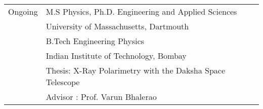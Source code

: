 {\centering
\begin{tabular}{>{\raggedleft\arraybackslash}p{} p{}}
    
    Ongoing             & M.S Physics, Ph.D. Engineering and Applied Sciences \\
                        & University of Massachusetts, Dartmouth \\
    2022                & B.Tech Engineering Physics \\
                        & Indian Institute of Technology, Bombay \\
                        & Thesis: X-Ray Polarimetry with the Daksha Space Telescope \\
                        & Advisor : Prof. Varun Bhalerao \\

\end{tabular}
} %